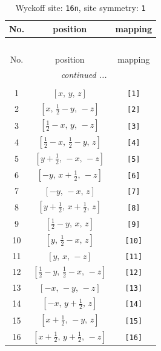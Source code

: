\documentclass[fleqn,8pt]{jsarticle}
\begin{document}
\begin{longtable}{ccc}
\caption{Wyckoff site: {\tt 16n}, site symmetry: {\tt 1}}
 \\
 \hline \hline
No. & position & mapping \\ \hline \endfirsthead

\multicolumn{2}{l}{\tablename\ \thetable{}} \\
 \hline \hline
No. & position & mapping \\ \hline \endhead

 \hline \hline
\multicolumn{2}{r}{\footnotesize\it continued ...} \\ \endfoot

 \hline \hline
\multicolumn{2}{r}{} \\ \endlastfoot

1 & $\left[ x,\, y,\, z \right]$ & {\tt [1]} \\ \hline
2 & $\left[ x,\, \frac{1}{2} - y,\, - z \right]$ & {\tt [2]} \\ \hline
3 & $\left[ \frac{1}{2} - x,\, y,\, - z \right]$ & {\tt [3]} \\ \hline
4 & $\left[ \frac{1}{2} - x,\, \frac{1}{2} - y,\, z \right]$ & {\tt [4]} \\ \hline
5 & $\left[ y + \frac{1}{2},\, - x,\, - z \right]$ & {\tt [5]} \\ \hline
6 & $\left[ - y,\, x + \frac{1}{2},\, - z \right]$ & {\tt [6]} \\ \hline
7 & $\left[ - y,\, - x,\, z \right]$ & {\tt [7]} \\ \hline
8 & $\left[ y + \frac{1}{2},\, x + \frac{1}{2},\, z \right]$ & {\tt [8]} \\ \hline
9 & $\left[ \frac{1}{2} - y,\, x,\, z \right]$ & {\tt [9]} \\ \hline
10 & $\left[ y,\, \frac{1}{2} - x,\, z \right]$ & {\tt [10]} \\ \hline
11 & $\left[ y,\, x,\, - z \right]$ & {\tt [11]} \\ \hline
12 & $\left[ \frac{1}{2} - y,\, \frac{1}{2} - x,\, - z \right]$ & {\tt [12]} \\ \hline
13 & $\left[ - x,\, - y,\, - z \right]$ & {\tt [13]} \\ \hline
14 & $\left[ - x,\, y + \frac{1}{2},\, z \right]$ & {\tt [14]} \\ \hline
15 & $\left[ x + \frac{1}{2},\, - y,\, z \right]$ & {\tt [15]} \\ \hline
16 & $\left[ x + \frac{1}{2},\, y + \frac{1}{2},\, - z \right]$ & {\tt [16]} \\
\end{longtable}
\end{document}
